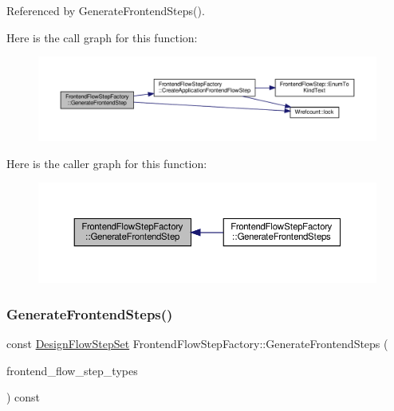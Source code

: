Referenced by Generate\+Frontend\+Steps().

Here is the call graph for this function\+:
\nopagebreak
\begin{figure}[H]
\begin{center}
\leavevmode
\includegraphics[width=350pt]{db/dd6/classFrontendFlowStepFactory_ac7a8cb4ae2c919fb2d4d44eed8e1c0fa_cgraph}
\end{center}
\end{figure}
Here is the caller graph for this function\+:
\nopagebreak
\begin{figure}[H]
\begin{center}
\leavevmode
\includegraphics[width=350pt]{db/dd6/classFrontendFlowStepFactory_ac7a8cb4ae2c919fb2d4d44eed8e1c0fa_icgraph}
\end{center}
\end{figure}
\mbox{\label{classFrontendFlowStepFactory_af2ae8d671cc18ec7bb69e8dc249d18d7}} 
\subsubsection{\texorpdfstring{Generate\+Frontend\+Steps()}{GenerateFrontendSteps()}}
{\footnotesize\ttfamily const \hyperlink{classDesignFlowStepSet}{Design\+Flow\+Step\+Set} Frontend\+Flow\+Step\+Factory\+::\+Generate\+Frontend\+Steps (\begin{DoxyParamCaption}\item[{const \hyperlink{classCustomUnorderedSet}{Custom\+Unordered\+Set}$<$ \hyperlink{frontend__flow__step_8hpp_afeb3716c693d2b2e4ed3e6d04c3b63bb}{Frontend\+Flow\+Step\+Type} $>$ \&}]{frontend\+\_\+flow\+\_\+step\+\_\+types }\end{DoxyParamCaption}) const}



